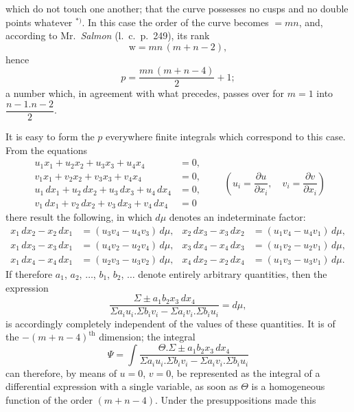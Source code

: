 \documentclass{article}
\begin{document}
which do not touch one another; that the curve possesses no cusps and no double points whatever ${}^{*)}$. In this case the order of the curve becomes $=mn$, and, according to Mr.\ \emph{Salmon} (l.\ c.\ p.\ 249), its rank
\[
\mathrm{w} = mn\,(m+n-2),
\]
hence
\[
p = \frac{mn\,(m+n-4)}{2}+1;
\]
a number which, in agreement with what precedes, passes over for $m=1$ into $\dfrac{n-1.n-2}{2}$.

It is easy to form the $p$ everywhere finite integrals which correspond to this case. From the equations
\[
\begin{aligned}
u_{1} x_{1}+u_{2} x_{2}+u_{3} x_{3}+u_{4} x_{4} &= 0,\\
v_{1} x_{1}+v_{2} x_{2}+v_{3} x_{3}+v_{4} x_{4} &= 0,\\
u_{1}\,dx_{1}+u_{2}\,dx_{2}+u_{3}\,dx_{3}+u_{4}\,dx_{4} &= 0,\\
v_{1}\,dx_{1}+v_{2}\,dx_{2}+v_{3}\,dx_{3}+v_{4}\,dx_{4} &= 0
\end{aligned}
\qquad
\left(u_{i} = \frac{\partial u}{\partial x_{i}}, \quad v_{i} = \frac{\partial v}{\partial x_{i}}\right)
\]
there result the following, in which $d\mu$ denotes an indeterminate factor:
\[
\begin{aligned}
x_{1}\,dx_{2}-x_{2}\,dx_{1} &= (u_{3} v_{4}-u_{4} v_{3})\,d\mu, & x_{2}\,dx_{3}-x_{3}\,dx_{2} &= (u_{1} v_{4}-u_{4} v_{1})\,d\mu,\\
x_{1}\,dx_{3}-x_{3}\,dx_{1} &= (u_{4} v_{2}-u_{2} v_{4})\,d\mu, & x_{3}\,dx_{4}-x_{4}\,dx_{3} &= (u_{1} v_{2}-u_{2} v_{1})\,d\mu,\\
x_{1}\,dx_{4}-x_{4}\,dx_{1} &= (u_{2} v_{3}-u_{3} v_{2})\,d\mu, & x_{4}\,dx_{2}-x_{2}\,dx_{4} &= (u_{1} v_{3}-u_{3} v_{1})\,d\mu.
\end{aligned}
\]
If therefore $a_{1}$, $a_{2}$, $\ldots$, $b_{1}$, $b_{2}$, $\ldots$ denote entirely arbitrary quantities, then the expression
\[
\frac{\Sigma \pm a_{1} b_{2} x_{3}\,dx_{4}}{\Sigma a_{i} u_{i}.\Sigma b_{i} v_{i} - \Sigma a_{i} v_{i}.\Sigma b_{i} u_{i}} = d\mu,
\]
is accordingly completely independent of the values of these quantities. It is of the $-(m+n-4)^{\text{th}}$ dimension; the integral
\[
\Psi = \int \frac{\Theta.\Sigma \pm a_{1} b_{2} x_{3}\,dx_{4}}{\Sigma a_{i} u_{i}.\Sigma b_{i} v_{i} - \Sigma a_{i} v_{i}.\Sigma b_{i} u_{i}}
\]
can therefore, by means of $u=0$, $v=0$, be represented as the integral of a differential expression with a single variable, as soon as $\Theta$ is a homogeneous function of the order $(m+n-4)$. Under the presuppositions made this
\end{document}
